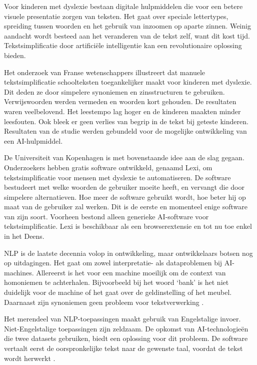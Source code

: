 
Voor kinderen met dyslexie bestaan digitale hulpmiddelen die voor een betere visuele presentatie zorgen van teksten. Het gaat over speciale lettertypes, spreiding tussen woorden en het gebruik van inzoomen op aparte zinnen. Weinig aandacht wordt besteed aan het veranderen van de tekst zelf, want dit kost tijd. Tekstsimplificatie door artificiële intelligentie kan een revolutionaire oplossing bieden. 

Het onderzoek van Franse wetenschappers \textcite{Gala2016} illustreert dat manuele tekstsimplificatie schoolteksten toegankelijker maakt voor kinderen met dyslexie. Dit deden ze door simpelere synoniemen en zinsstructuren te gebruiken. Verwijswoorden werden vermeden en woorden kort gehouden. De resultaten waren veelbelovend. Het leestempo lag hoger en de kinderen maakten minder leesfouten. Ook bleek er geen verlies van begrip in de tekst bij geteste kinderen. Resultaten van de studie werden gebundeld voor de mogelijke ontwikkeling van een AI-hulpmiddel.

De Universiteit van Kopenhagen is met bovenstaande idee aan de slag gegaan. Onderzoekers \textcite{Bingel2018} hebben gratis software ontwikkeld, genaamd Lexi, om tekstsimplificatie voor mensen met dyslexie te automatiseren. De software bestudeert met welke woorden de gebruiker moeite heeft, en vervangt die door simpelere alternatieven. Hoe meer de software gebruikt wordt, hoe beter hij op maat van de gebruiker zal werken. Dit is de eerste en momenteel enige software van zijn soort. Voorheen bestond alleen generieke AI-software voor tekstsimplificatie. Lexi is beschikbaar als een browserextensie en tot nu toe enkel in het Deens. 

NLP is de laatste decennia volop in ontwikkeling, maar ontwikkelaars botsen nog op uitdagingen. Het gaat om zowel interpretatie- als dataproblemen bij AI-machines. Allereerst is het voor een machine moeilijk om de context van homoniemen te achterhalen. Bijvoorbeeld bij het woord ‘bank’ is het niet duidelijk voor de machine of het gaat over de geldinstelling of het meubel. Daarnaast zijn synoniemen geen probleem voor tekstverwerking \autocite{Roldos2020}.

Het merendeel van NLP-toepassingen maakt gebruik van Engelstalige invoer. Niet-Engelstalige toepassingen zijn zeldzaam. De opkomst van AI-technologieën die twee datasets gebruiken, biedt een oplossing voor dit probleem. De software vertaalt eerst de oorspronkelijke tekst naar de gewenste taal, voordat de tekst wordt herwerkt \autocite{Sciforce2020}.

